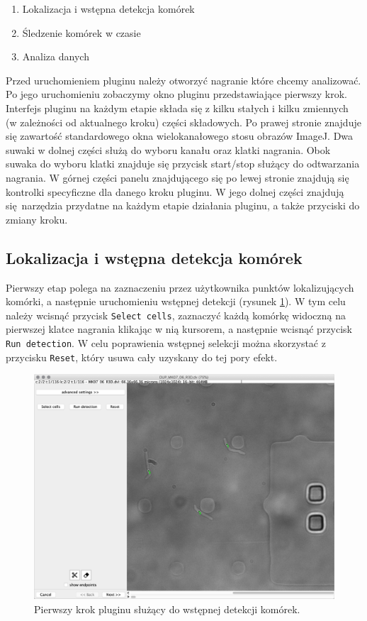 \documentclass[declaration,shortabstract,mgr]{iithesis}
\begin{document}
\begin{enumerate}
  \item Lokalizacja i wstępna detekcja komórek
  \item Śledzenie komórek w czasie
  \item Analiza danych
\end{enumerate}

Przed uruchomieniem pluginu należy otworzyć nagranie które chcemy analizować. Po jego uruchomieniu zobaczymy okno pluginu przedstawiające pierwszy krok.
Interfejs pluginu na każdym etapie składa się z kilku stałych i kilku zmiennych (w zależności od aktualnego kroku) części składowych.
Po prawej stronie znajduje się zawartość standardowego okna wielokanałowego stosu obrazów ImageJ.
Dwa suwaki w dolnej części służą do wyboru kanału oraz klatki nagrania.
Obok suwaka do wyboru klatki znajduje się przycisk start/stop służący do odtwarzania nagrania.
W górnej części panelu znajdującego się po lewej stronie znajdują się kontrolki specyficzne dla danego kroku pluginu. W jego dolnej części znajdują się narzędzia przydatne na każdym etapie działania pluginu, a także przyciski do zmiany kroku.


\subsection{Lokalizacja i wstępna detekcja komórek}

Pierwszy etap polega na zaznaczeniu przez użytkownika punktów lokalizujących komórki, a następnie uruchomieniu wstępnej detekcji (rysunek \ref{fig:ui-step-detector}).
W tym celu należy wcisnąć przycisk \texttt{Select cells}, zaznaczyć każdą komórkę widoczną na pierwszej klatce nagrania klikając w nią kursorem, a następnie wcisnąć przycisk \texttt{Run detection}.
W celu poprawienia wstępnej selekcji można skorzystać z przycisku \texttt{Reset}, który usuwa cały uzyskany do tej pory efekt.

\begin{figure}
  \centering
  \includegraphics[width=\textwidth]{images/ui-step-detector.png}
  \caption{Pierwszy krok pluginu służący do wstępnej detekcji komórek.}
  \label{fig:ui-step-detector}
\end{figure}
\end{document}
